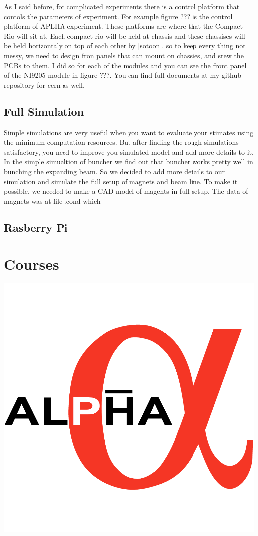 \documentclass{article}
\begin{document}
As I said before, for complicated experiments there is a control platform that contols the parameters of experiment. For example figure ??? is the control platform of APLHA experiment.
These platforms are where that the Compact Rio will sit at. Each compact rio will be held at chassis and these chassises will be held horizontaly on top of each other by [sotoon]. so to keep every thing not messy, we need to design fron panels that can mount on chassies, and srew the PCBs to them. I did so for each of the modules and you can see the front panel of the NI9205 module in figure ???. You can find full documents at my github repository for cern as well.


\subsection{Full Simulation}
‌Simple simulations are very useful when you want to evaluate your stimates using the minimum computation resources. But after finding the rough simulations satisfactory, you need to improve you simulated model and add more details to it. In the simple simualtion of buncher we find out that buncher works pretty well in bunching the expanding beam. So we decided to add more details to our simulation and simulate the full setup of magnets and beam line. To make it possible, we needed to make a CAD model of magents in full setup. The data of magnets was at file .cond which  


\subsection{Rasberry Pi}





\section{Courses}
\includegraphics[scale=1]{Alpha}
\end{document}
